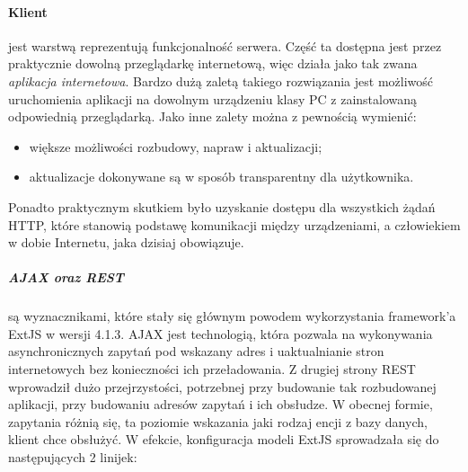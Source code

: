 			
		\paragraph{Klient} jest warstwą reprezentują funkcjonalność serwera. Część ta dostępna jest przez praktycznie
		dowolną przeglądarkę internetową, więc działa jako tak zwana \emph{aplikacja internetowa}. Bardzo
		dużą zaletą takiego rozwiązania jest możliwość uruchomienia aplikacji na dowolnym urządzeniu klasy PC z zainstalowaną
		odpowiednią przeglądarką. Jako inne zalety można z pewnością wymienić: 
		\begin{itemize}
			\item większe możliwości rozbudowy, napraw i aktualizacji;
			\item aktualizacje dokonywane są w sposób transparentny dla użytkownika.
		\end{itemize}
		Ponadto praktycznym skutkiem było uzyskanie dostępu dla wszystkich żądań HTTP, które stanowią podstawę
		komunikacji między urządzeniami, a człowiekiem w dobie Internetu, jaka dzisiaj obowiązuje.
		\subparagraph{AJAX oraz REST} są wyznacznikami, które stały się głównym powodem wykorzystania
		framework'a ExtJS w wersji 4.1.3. AJAX jest technologią, która pozwala na wykonywania asynchronicznych
		zapytań pod wskazany adres i uaktualnianie stron internetowych bez konieczności ich przeładowania. 
		Z drugiej strony REST wprowadził dużo przejrzystości, potrzebnej przy budowanie tak rozbudowanej aplikacji,
		przy budowaniu adresów zapytań i ich obsłudze. W obecnej formie, zapytania różnią się, ta poziomie
		wskazania jaki rodzaj encji z bazy danych, klient chce obsłużyć. W efekcie, konfiguracja modeli ExtJS
		sprowadzała się do następujących 2 linijek:
		
		
